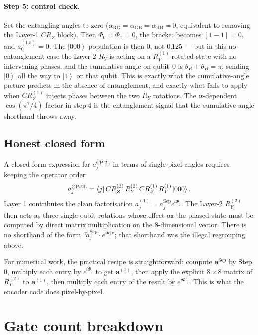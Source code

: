 \documentclass[11pt]{article}
\newcommand{\ket}[1]{\left| #1 \right\rangle}
\begin{document}
\paragraph{Step 5: control check.} Set the entangling angles to zero ($\alpha_\text{RG} = \alpha_\text{GB} = \alpha_\text{RB} = 0$, equivalent to removing the Layer-1 $CR_Z$ block). Then $\Phi_0 = \Phi_1 = 0$, the bracket becomes $[1 - 1] = 0$, and $a^{(1.5)}_0 = 0$. The $\ket{000}$ population is then $0$, not $0.125$ — but in this no-entanglement case the Layer-2 $R_Y$ is acting on a $R_Y^{(1)}$-rotated state with no intervening phases, and the cumulative angle on qubit~0 is $\theta_R + \theta_B = \pi$, sending $\ket{0}$ all the way to $\ket{1}$ on that qubit. This is exactly what the cumulative-angle picture predicts in the absence of entanglement, and exactly what fails to apply when $CR_Z^{(1)}$ injects phases between the two $R_Y$ rotations. The $\alpha$-dependent $\cos(\pi^2/4)$ factor in step 4 is the entanglement signal that the cumulative-angle shorthand throws away.

\subsection{Honest closed form}

A closed-form expression for $a^\text{CP-2L}_j$ in terms of single-pixel angles requires keeping the operator order:
\[
a^\text{CP-2L}_j = \bra{j} CR_Z^{(2)} \, R_Y^{(2)} \, CR_Z^{(1)} \, R_Y^{(1)} \ket{000}.
\]
Layer 1 contributes the clean factorisation $a^{(1)}_j = a^\text{Sep}_j e^{i\Phi_j}$. The Layer-2 $R_Y^{(2)}$ then acts as three single-qubit rotations whose effect on the phased state must be computed by direct matrix multiplication on the 8-dimensional vector. There is no shorthand of the form ``$\tilde a^\text{Sep}_j \cdot e^{i\theta_j}$''; that shorthand was the illegal regrouping above.

For numerical work, the practical recipe is straightforward: compute $\mathbf a^\text{Sep}$ by Step 0, multiply each entry by $e^{i\Phi_j}$ to get $\mathbf a^{(1)}$, then apply the explicit $8 \times 8$ matrix of $R_Y^{(2)}$ to $\mathbf a^{(1)}$, then multiply each entry of the result by $e^{i\Phi'_j}$. This is what the encoder code does pixel-by-pixel.

\section{Gate count breakdown}
\end{document}
